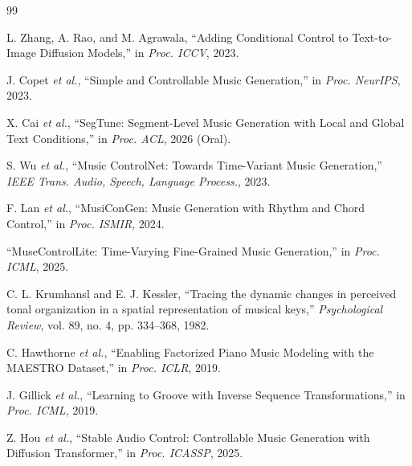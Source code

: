 \documentclass[UTF8,12pt,a4paper]{ctexart}
\begin{document}
\begin{thebibliography}{99}

L. Zhang, A. Rao, and M. Agrawala, ``Adding Conditional Control to Text-to-Image Diffusion Models,'' in \textit{Proc. ICCV}, 2023.

J. Copet \textit{et al.}, ``Simple and Controllable Music Generation,'' in \textit{Proc. NeurIPS}, 2023.

X. Cai \textit{et al.}, ``SegTune: Segment-Level Music Generation with Local and Global Text Conditions,'' in \textit{Proc. ACL}, 2026 (Oral).

S. Wu \textit{et al.}, ``Music ControlNet: Towards Time-Variant Music Generation,'' \textit{IEEE Trans. Audio, Speech, Language Process.}, 2023.

F. Lan \textit{et al.}, ``MusiConGen: Music Generation with Rhythm and Chord Control,'' in \textit{Proc. ISMIR}, 2024.

``MuseControlLite: Time-Varying Fine-Grained Music Generation,'' in \textit{Proc. ICML}, 2025.

C. L. Krumhansl and E. J. Kessler, ``Tracing the dynamic changes in perceived tonal organization in a spatial representation of musical keys,'' \textit{Psychological Review}, vol. 89, no. 4, pp. 334--368, 1982.

C. Hawthorne \textit{et al.}, ``Enabling Factorized Piano Music Modeling with the MAESTRO Dataset,'' in \textit{Proc. ICLR}, 2019.

J. Gillick \textit{et al.}, ``Learning to Groove with Inverse Sequence Transformations,'' in \textit{Proc. ICML}, 2019.

Z. Hou \textit{et al.}, ``Stable Audio Control: Controllable Music Generation with Diffusion Transformer,'' in \textit{Proc. ICASSP}, 2025.

\end{thebibliography}
\end{document}
